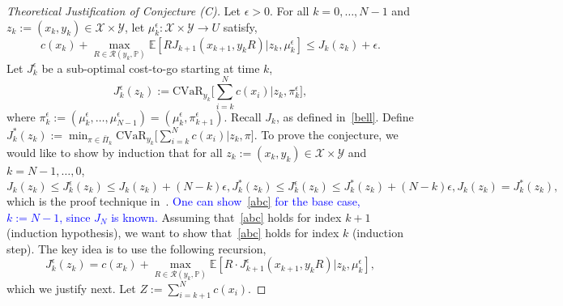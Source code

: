 \documentclass[letterpaper, 10 pt, conference]{ieeeconf}  %
\begin{document}
\begin{proof}[Theoretical Justification of Conjecture (C)]
Let $\epsilon > 0$. For all $k = 0, \dots, N-1$ and $z_k := (x_k, y_k) \in \mathcal{X} \times \mathcal{Y}$, let $\mu_k^\epsilon : \mathcal{X} \times \mathcal{Y} \to U$ satisfy,
%
\begin{equation} 
c(x_k) + {\underset{R \in \mathcal{R}(y_k, \mathbb{P})}\max} \mathbb{E}[ RJ_{k+1}(x_{k+1}, y_k R) | z_k, \mu_k^\epsilon] \leq J_k(z_k) + \epsilon.
\label{first}\end{equation} 
%
Let $J_k^\epsilon$ be a sub-optimal cost-to-go starting at time $k$,
%
\begin{equation} 
J_k^\epsilon(z_k) := \text{CVaR}_{y_k}\big[\textstyle \sum_{i=k}^N c(x_i) \big| z_k, \pi_k^\epsilon \big],
\label{Jkeps}\end{equation}
%
where $\pi_k^\epsilon := (\mu_k^\epsilon,\dots,\mu_{N-1}^\epsilon) = (\mu_k^\epsilon, \pi_{k+1}^\epsilon)$. Recall $J_k$, as defined in~\eqref{bell}. Define $J_k^*(z_k) := \min_{\pi \in \bar{\Pi}_k} \text{CVaR}_{y_k}\big[\textstyle \sum_{i=k}^N c(x_i) \big| z_k, \pi \big]$.
To prove the conjecture, we would like to show  by induction that for all $z_k := (x_k, y_k) \in \mathcal{X} \times \mathcal{Y}$ and $k = N-1, \dots, 0$,
%
\begin{subequations}\label{abc}
\begin{equation}
J_k(z_k) \leq J_k^\epsilon(z_k) \leq J_k(z_k) + (N-k)\epsilon, 
\label{a}\end{equation}
%
\begin{equation}
J_k^*(z_k) \leq J_k^\epsilon(z_k) \leq J_k^*(z_k) + (N-k)\epsilon, 
\label{b}\end{equation}
%
\begin{equation}
J_k(z_k) = J_k^*(z_k), 
\label{c}\end{equation}
\end{subequations}
%
which is the proof technique in~\cite[Sec. 1.5]{bertsekas2005dynamic}. 
\textcolor{blue}{One can show~\eqref{abc} for the base case, $k := N-1$, since $J_N$ is known.}
Assuming that~\eqref{abc} holds for index $k+1$ (induction hypothesis), we want to show that~\eqref{abc} holds for index $k$ (induction step). The key 
idea is to use the following recursion,
%
\begin{equation}
J_k^\epsilon(z_k) = c(x_k) + {\underset{R \in \mathcal{R}(y_k, \mathbb{P})}\max} \mathbb{E}[ R\cdot J^\epsilon_{k+1}(x_{k+1}, y_k R) | z_k, \mu_k^\epsilon],
\label{Jkepsrec}\end{equation}
%
which we justify next. Let $Z := \sum_{i=k+1}^N c(x_i)$. 

\end{proof}
\end{document}
